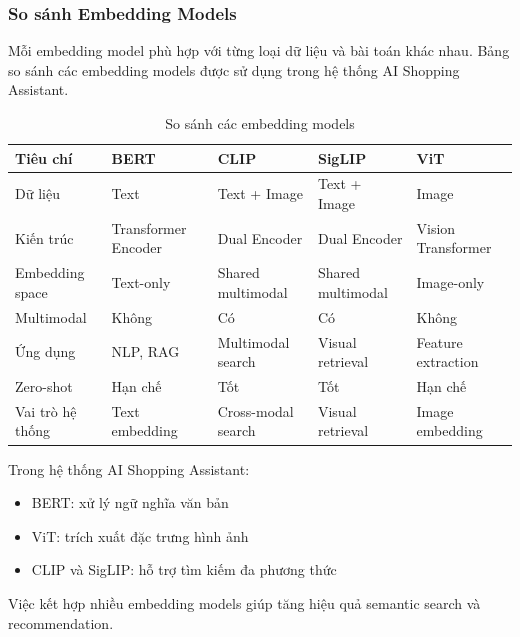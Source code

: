 \subsubsection{So sánh Embedding Models}

Mỗi embedding model phù hợp với từng loại dữ liệu và bài toán khác nhau. Bảng  so sánh các embedding models được sử dụng trong hệ thống AI Shopping Assistant.

\begin{table}[H]
\centering
\caption{So sánh các embedding models}
\label{tab:embedding_comparison}

\small
\setlength{\tabcolsep}{4pt}
\renewcommand{\arraystretch}{1.2}

\begin{tabular}{@{}p{3cm}p{2.5cm}p{2.5cm}p{2.5cm}p{2.5cm}@{}}
\toprule
\textbf{Tiêu chí} & \textbf{BERT} & \textbf{CLIP} & \textbf{SigLIP} & \textbf{ViT} \\
\midrule
Dữ liệu & Text & Text + Image & Text + Image & Image \\
Kiến trúc & Transformer Encoder & Dual Encoder & Dual Encoder & Vision Transformer \\
Embedding space & Text-only & Shared multimodal & Shared multimodal & Image-only \\
Multimodal & Không & Có & Có & Không \\
Ứng dụng & NLP, RAG & Multimodal search & Visual retrieval & Feature extraction \\
Zero-shot & Hạn chế & Tốt & Tốt & Hạn chế \\
Vai trò hệ thống & Text embedding & Cross-modal search & Visual retrieval & Image embedding \\
\bottomrule
\end{tabular}
\end{table}

Trong hệ thống AI Shopping Assistant:
\begin{itemize}
    \item BERT: xử lý ngữ nghĩa văn bản
    \item ViT: trích xuất đặc trưng hình ảnh
    \item CLIP và SigLIP: hỗ trợ tìm kiếm đa phương thức
\end{itemize}

Việc kết hợp nhiều embedding models giúp tăng hiệu quả semantic search và recommendation.

